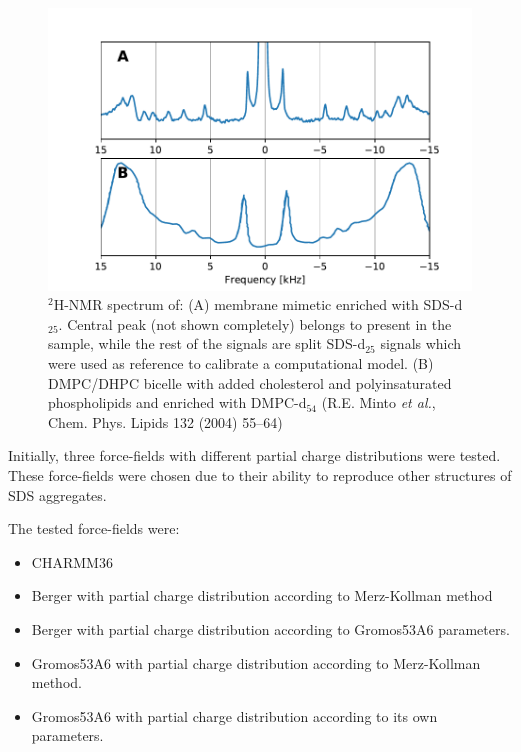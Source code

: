 \documentclass[3p,preprint,review]{elsarticle}
\begin{document}
	\begin{figure}[h]
		\centering
		\includegraphics[width=\columnwidth]{nmr_reference.pdf}
		\caption{$^2$H-NMR spectrum of: (A) membrane mimetic enriched with SDS-d$_{25}$.
			Central peak (not shown completely) belongs to  present in the
			sample, while the rest of the signals are split SDS-d$_{25}$ signals which
			were used as reference to calibrate a computational model. (B) DMPC/DHPC bicelle with added cholesterol and polyinsaturated phospholipids and enriched with DMPC-d$_{54}$ (R.E. Minto \textit{et al.}, Chem. Phys. Lipids 132 (2004) 55–64)}
		\label{fig:reference}
	\end{figure}
	Initially,
	three force-fields with different partial charge distributions were tested.
	These force-fields were chosen due to their ability to reproduce other
	structures of
	SDS aggregates\cite{Tang2014}.\par
	The tested force-fields were:
	\begin{itemize}
		\item CHARMM36\cite{Vanommeslaeghe2009}
		\item Berger\cite{Berger1997} with partial charge distribution according to
		Merz-Kollman
		method\cite{Besler1990}
		\item Berger with partial charge distribution according to
		Gromos53A6\cite{Oostenbrink2004}
		parameters.
		\item Gromos53A6 with partial charge distribution according to Merz-Kollman
		method.
		\item Gromos53A6 with partial charge distribution according to its own
		parameters.
	\end{itemize}
	
\end{document}

